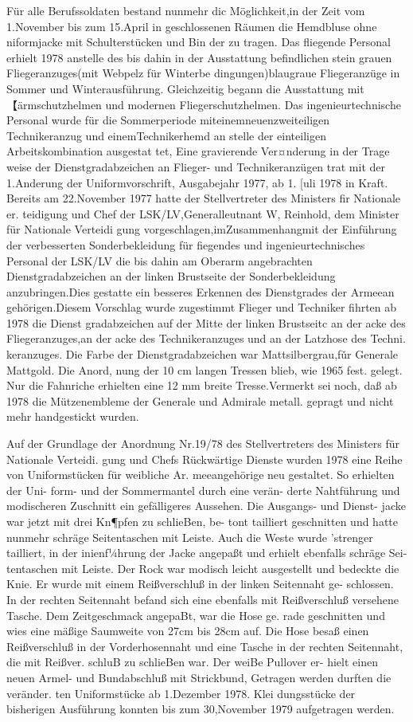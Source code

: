 Für alle Berufssoldaten bestand nunmehr dic
Möglichkeit,in der Zeit vom 1.November bis zum
15.April in geschlossenen Räumen die Hemdbluse
ohne niformjacke mit Schulterstücken und Bin
der zu tragen.
Das fliegende Personal erhielt 1978 anstelle des
bis dahin in der Ausstattung befindlichen stein
grauen Fliegeranzuges(mit Webpelz für Winterbe
dingungen)blaugraue Fliegeranzüge in Sommer
und Winterausführung. Gleichzeitig begann die
Ausstattung mit 【ärmschutzhelmen und modernen
Fliegerschutzhelmen.
Das ingenieurtechnische Personal wurde für die
Sommerperiode miteinemneuenzweiteiligen
Technikeranzug und einemTechnikerhemd an
stelle der einteiligen Arbeitskombination ausgestat
tet, Eine gravierende Ver¤nderung in der Trage
weise der Dienstgradabzeichen an Flieger- und
Technikeranzügen trat mit der 1.Anderung der
Uniformvorschrift, Ausgabejahr 1977, ab 1. [uli
1978 in Kraft. Bereits am 22.November 1977 hatte
der Stellvertreter des Ministers fir Nationale er.
teidigung und Chef der LSK/LV,Generalleutnant
W, Reinhold, dem Minister für Nationale Verteidi
gung vorgeschlagen,imZusammenhangmit der
Einführung der verbesserten Sonderbekleidung für
fiegendes und ingenieurtechnisches Personal der
LSK/LV die bis dahin am Oberarm angebrachten
Dienstgradabzeichen an der linken Brustseite der
Sonderbekleidung anzubringen.Dies gestatte ein
besseres Erkennen des Dienstgrades der Armeean
gehörigen.Diesem Vorschlag wurde zugestimmt
Flieger und Techniker fihrten ab 1978 die Dienst
gradabzeichen auf der Mitte der linken Brustseitc
an der acke des Fliegeranzuges,an der acke des
Technikeranzuges und an der Latzhose des Techni.
keranzuges. Die Farbe der Dienstgradabzeichen war
Mattsilbergrau,fǔr Generale Mattgold. Die Anord,
nung der 10 cm langen Tressen blieb, wie 1965 fest.
gelegt. Nur die Fahnriche erhielten eine 12 mm
breite Tresse.Vermerkt sei noch, daß ab 1978 die
Mützenembleme der Generale und Admirale metall.
gepragt und nicht mehr handgestickt wurden.

Auf der Grundlage der Anordnung Nr.19/78 des
Stellvertreters des Ministers für Nationale Verteidi.
gung und Chefs Rückwärtige Dienste wurden 1978
eine Reihe von Uniformstücken für weibliche Ar.
meeangehörige neu gestaltet. So erhielten der Uni-
form- und der Sommermantel durch eine verän-
derte Nahtführung und modischeren Zuschnitt ein
gefälligeres Aussehen. Die Ausgangs- und Dienst-
jacke war jetzt mit drei Kn¶pfen zu schlieBen, be-
tont tailliert geschnitten und hatte nunmehr
schräge Seitentaschen mit Leiste. Auch die Weste
wurde 'strenger tailliert, in der inienf¼hrung der
Jacke angepaßt und erhielt ebenfalls schräge Sei-
tentaschen mit Leiste. Der Rock war modisch leicht
ausgestellt und bedeckte die Knie. Er wurde mit
einem Reißverschluß in der linken Seitennaht ge-
schlossen. In der rechten Seitennaht befand sich
eine ebenfalls mit Reißverschluß versehene Tasche.
Dem Zeitgeschmack angepaBt, war die Hose ge.
rade geschnitten und wies eine mäßige Saumweite
von 27cm bis 28cm auf. Die Hose besaß einen
Reißverschluß in der Vorderhosennaht und eine
Tasche in der rechten Seitennaht, die mit Reißver.
schluB zu schlieBen war. Der weiBe Pullover er-
hielt einen neuen Armel- und Bundabschluß mit
Strickbund, Getragen werden durften die veränder.
ten Uniformstücke ab 1.Dezember 1978. Klei
dungsstücke der bisherigen Ausführung konnten
bis zum 30,November 1979 aufgetragen werden.